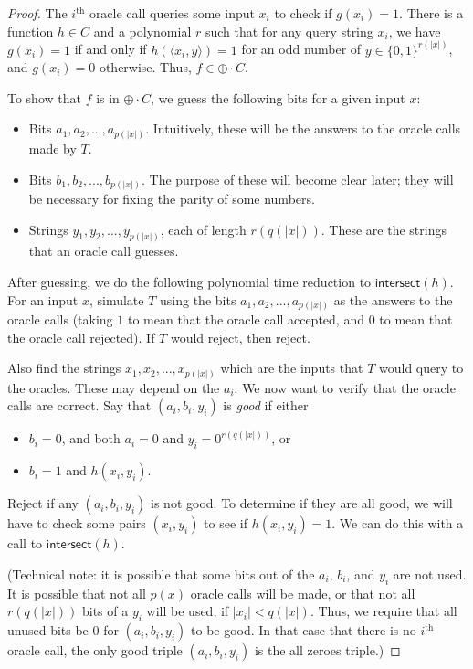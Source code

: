 \documentclass[11pt]{article}
\newcommand{\parity}{\oplus}
\newcommand{\intersect}{\textsf{intersect}}
\begin{document}
\begin{proof}
The $i^\text{th}$ oracle call queries some input $x_i$ to check if $g(x_i) = 1$. There is a function $h \in C$ and a polynomial $r$ such that for any query string $x_i$, we have $g(x_i) = 1$ if and only if $h(\langle x_i,y\rangle) = 1$ for an odd number of $y\in\{0,1\}^{r(|x|)}$, and $g(x_i) = 0$ otherwise. Thus, $f \in \parity \cdot C$.

To show that $f$ is in $\parity \cdot C$, we guess the following bits for a given input $x$:
\begin{itemize}
\item Bits $a_1,a_2,...,a_{p(|x|)}$. Intuitively, these will be the answers to the oracle calls made by $T$.
\item Bits $b_1,b_2,...,b_{p(|x|)}$. The purpose of these will become clear later; they will be necessary for fixing the parity of some numbers.
\item Strings $y_1,y_2,...,y_{p(|x|)}$, each of length $r(q(|x|))$. These are the strings that an oracle call guesses.
\end{itemize}
After guessing, we do the following polynomial time reduction to $\intersect(h)$. For an input $x$, simulate $T$ using the bits $a_1,a_2,...,a_{p(|x|)}$ as the answers to the oracle calls (taking $1$ to mean that the oracle call accepted, and $0$ to mean that the oracle call rejected). If $T$ would reject, then reject.

Also find the strings $x_1,x_2,...,x_{p(|x|)}$ which are the inputs that $T$ would query to the oracles. These may depend on the $a_i$. We now want to verify that the oracle calls are correct. Say that $(a_i, b_i, y_i)$ is \emph{good} if either
\begin{itemize}
\item $b_i = 0$, and both $a_i = 0$ and $y_i = 0^{r(q(|x|))}$, or
\item $b_i = 1$ and $h(x_i, y_i)$.
\end{itemize}
Reject if any $(a_i, b_i, y_i)$ is not good. To determine if they are all good, we will have to check some pairs $(x_i, y_i)$ to see if $h(x_i,y_i) = 1$. We can do this with a call to $\intersect(h)$.

(Technical note: it is possible that some bits out of the $a_i$, $b_i$, and $y_i$ are not used. It is possible that not all $p(x)$ oracle calls will be made, or that not all $r(q(|x|))$ bits of a $y_i$ will be used, if $|x_i| < q(|x|)$. Thus, we require that all unused bits be $0$ for $(a_i, b_i, y_i)$ to be good. In that case that there is no $i^\text{th}$ oracle call, the only good triple $(a_i, b_i, y_i)$ is the all zeroes triple.)


\end{proof}
\end{document}
